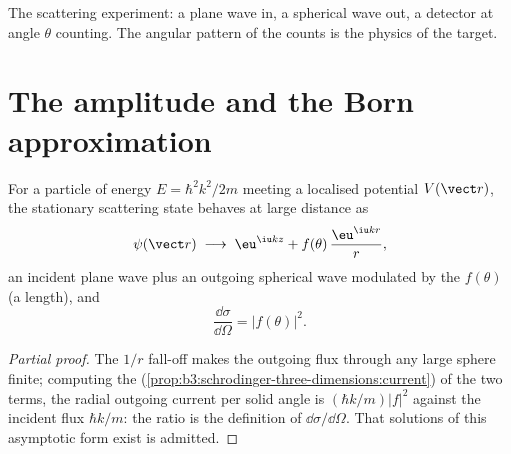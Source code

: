 \begin{omfigure}

{\small The scattering experiment: a plane wave in, a spherical
wave out, a detector at angle $\theta$ counting. The angular
pattern of the counts is the physics of the target.}
\end{omfigure}

\section{The amplitude and the Born approximation}

\begin{theorem}\label{thm:b3:scattering-theory:amplitude}
For a particle of energy $E = \hbar^2k^2/2m$ meeting a localised
potential $V(\vect r)$, the stationary scattering state behaves at
large distance as
\[
\psi(\vect r) \;\longrightarrow\;
\eu^{\iu kz} + f(\theta)\,\frac{\eu^{\iu kr}}{r} ,
\]
an incident plane wave plus an outgoing spherical wave modulated by
the \emph{} $f(\theta)$ (a length), and
\[
\frac{\dd\sigma}{\dd\Omega} = |f(\theta)|^2 .
\]
\end{theorem}

\begin{proof}[Partial proof]
The $1/r$ fall-off makes the outgoing flux through any large sphere
finite; computing the 
(\cref{prop:b3:schrodinger-three-dimensions:current}) of the two
terms, the radial outgoing current per solid angle is
$(\hbar k/m)|f|^2$ against the incident flux $\hbar k/m$: the ratio
is the definition of $\dd\sigma/\dd\Omega$. That solutions of this
asymptotic form exist is admitted.
\end{proof}

